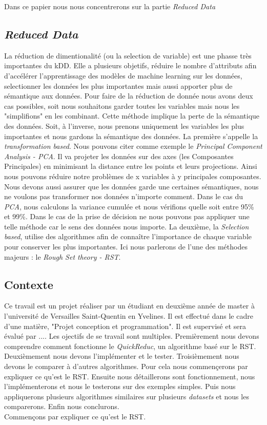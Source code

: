 Dans ce papier nous nous concentrerons sur la partie \textit{Reduced Data}

\newpage
\subsection{\textit{Reduced Data}}
La réduction de dimentionalité (ou la selection de variable) est une
phasse très importantes du kDD. Elle a plusieurs objetifs, réduire le
nombre d'attributs afin d'accélérer l'apprentissage des modèles de
machine learning sur les données, selectionner les données les
plus importantes mais aussi apporter plus de sémantique aux données.
Pour faire de la réduction de donnée nous avons deux cas possibles,
soit nous souhaitons garder toutes les variables mais nous les
"simplifions" en les combinant. Cette méthode implique la perte de la
sémantique des données. Soit, à l'inverse, nous prenons uniquement les
variables les plus importantes et nous gardons la sémantique des
données.
La première s'appelle la \textit{transformation based}. Nous pouvons
citer comme exemple le \textit{Principal Component Analysis - PCA}.
Il va projeter les données sur des axes (les Composantes Principales)
en minimisant la distance entre les points et leurs projections.
Ainsi nous pouvons réduire notre problèmes de x variables à y
principales composantes. Nous devons aussi assurer que les données
garde une certaines sémantiques, nous ne voulons pas transformer nos
données n'importe comment. Dans le cas du \textit{PCA}, nous
calculons la variance cumulée et nous vérifions quelle soit entre
95\% et 99\%. Dans le cas de la prise de décision ne nous pouvons
pas appliquer une telle méthode car le sens des données nous importe.
La deuxième, la \textit{Selection based}, utilise des algorithmes
afin de connaître l'importance de chaque variable pour conserver
les plus importantes. Ici nous parlerons de l'une des méthodes
majeurs : le \textit{Rough Set theory - RST}.

\subsection{Contexte}
Ce travail est un projet réaliser par un étudiant en deuxième année
de master à l'université de Versailles Saint-Quentin en Yvelines.
Il est effectué dans le cadre d'une matière, "Projet conception et
programmation". Il est supervisé et sera évalué par ....
Les ojectifs de se travail sont multiples. Premièrement nous devons
comprendre comment fonctionne le \textit{QuickReduc}, un algorithme
basé sur le RST. Deuxièmement nous devons l'implémenter et le tester.
Troisièmement nous devons le comparer à d'autres algorithmes.
Pour cela nous commençerons par expliquer ce qu'est le RST. Ensuite
nous détaillerons sont fonctionnement, nous l'implémenterons et nous
le testerons sur des exemples simples. Puis nous appliquerons
plusieurs algorithmes similaires sur plusieurs \textit{datasets} et
nous les comparerons. Enfin nous conclurons. \\

\noindent
Commençons par expliquer ce qu'est le RST.